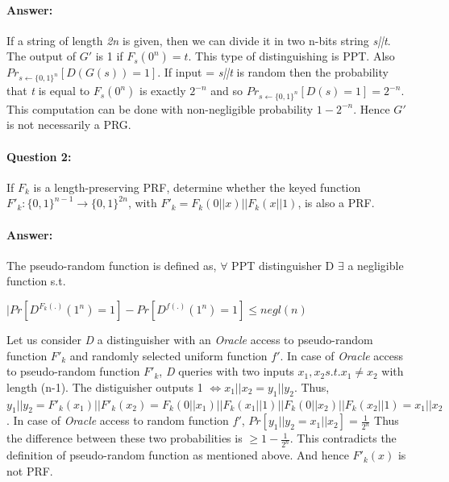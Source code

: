 \documentclass{article}
\begin{document}
    \paragraph{Answer: \newline}
        If a string of length \emph{2n} is given, then we can divide it in two n-bits string \emph{s||t}. The output of $G\prime$ is 1 if ${F_s}(0^n) = t$. This type of distinguishing is PPT. Also $Pr_{s\leftarrow{\{0,1\}^n}}[D(G(s)) = 1]$. If input = \emph{s||t} is random then the probability that \emph{t} is equal to $F_s{(0^n)}$ is exactly $2^{-n}$ and so $Pr_{s\leftarrow{\{0,1\}^n}}[D(s) = 1] = 2^{-n}$. This computation can be done with non-negligible probability ${1-2^{-n}}$. Hence $G\prime$ is not necessarily a PRG.
    
    \paragraph{Question 2:} If $F_k$ is a length-preserving PRF, determine whether the keyed function ${F\prime}_k:{\{0,1\}}^{n-1}\rightarrow{\{0,1\}}^{2n}$, with ${F\prime}_k=F_k(0||x)||F_k(x||1)$, is also a PRF.
    \paragraph{Answer: \newline}
        The pseudo-random function is defined as, $\forall$ PPT distinguisher D $\exists$ a negligible function s.t.
        \begin{center}
            $|Pr[D^{F_k(.)}(1^n) = 1] - Pr[D^{f(.)}(1^n) = 1] \leq negl(n)$
        \end{center}
        Let us consider \emph{D} a distinguisher with an \emph{Oracle} access to pseudo-random function $F\prime_k$ and randomly selected uniform function $f\prime$.
        In case of \emph{Oracle} access to pseudo-random function $F\prime_k$, \emph{D} queries with two inputs $x_1,x_2 s.t. x_1 \neq x_2$ with length (n-1). The distiguisher outputs 1 $\iff x_1||x_2 = y_1||y_2$. \newline
        Thus, $y_1||y_2 = F\prime_k(x_1)||F\prime_k(x_2) = F_k(0||x_1)||F_k(x_1||1)||F_k(0||x_2)||F_k(x_2||1) = x_1||x_2$.\newline
        In case of \emph{Oracle} access to random function $f\prime$, $Pr[y_1||y_2 = x_1||x_2] = \frac{1}{2^n}$\newline
        Thus the difference between these two probabilities is $\geq 1 - \frac{1}{2^n}$. This contradicts the definition of pseudo-random function as mentioned above. And hence $F\prime_k(x)$ is not PRF.
        
\end{document}
